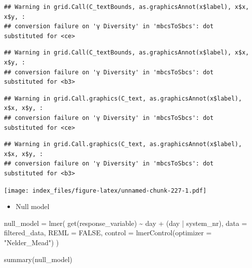 \documentclass[
]{article}
\newenvironment{Shaded}{\begin{snugshade}}{\end{snugshade}}
\newcommand{\AttributeTok}[1]{\textcolor[rgb]{0.77,0.63,0.00}{#1}}
\newcommand{\ConstantTok}[1]{\textcolor[rgb]{0.00,0.00,0.00}{#1}}
\newcommand{\FunctionTok}[1]{\textcolor[rgb]{0.00,0.00,0.00}{#1}}
\newcommand{\NormalTok}[1]{#1}
\newcommand{\OtherTok}[1]{\textcolor[rgb]{0.56,0.35,0.01}{#1}}
\newcommand{\SpecialCharTok}[1]{\textcolor[rgb]{0.00,0.00,0.00}{#1}}
\newcommand{\StringTok}[1]{\textcolor[rgb]{0.31,0.60,0.02}{#1}}
\providecommand{\tightlist}{%
  \setlength{\itemsep}{0pt}\setlength{\parskip}{0pt}}
\begin{document}
\begin{verbatim}
## Warning in grid.Call(C_textBounds, as.graphicsAnnot(x$label), x$x, x$y, :
## conversion failure on 'γ Diversity' in 'mbcsToSbcs': dot substituted for <ce>
\end{verbatim}

\begin{verbatim}
## Warning in grid.Call(C_textBounds, as.graphicsAnnot(x$label), x$x, x$y, :
## conversion failure on 'γ Diversity' in 'mbcsToSbcs': dot substituted for <b3>
\end{verbatim}

\begin{verbatim}
## Warning in grid.Call.graphics(C_text, as.graphicsAnnot(x$label), x$x, x$y, :
## conversion failure on 'γ Diversity' in 'mbcsToSbcs': dot substituted for <ce>
\end{verbatim}

\begin{verbatim}
## Warning in grid.Call.graphics(C_text, as.graphicsAnnot(x$label), x$x, x$y, :
## conversion failure on 'γ Diversity' in 'mbcsToSbcs': dot substituted for <b3>
\end{verbatim}

\texttt{[image: index\_files/figure-latex/unnamed-chunk-227-1.pdf]}

\begin{itemize}
\tightlist
\item
  Null model
\end{itemize}

\begin{Shaded}
\begin{Highlighting}[]
\NormalTok{null\_model }\OtherTok{=} \FunctionTok{lmer}\NormalTok{(}
  \FunctionTok{get}\NormalTok{(response\_variable) }\SpecialCharTok{\textasciitilde{}}
\NormalTok{    day }\SpecialCharTok{+} 
\NormalTok{    (day }\SpecialCharTok{|}\NormalTok{ system\_nr), }
  \AttributeTok{data =}\NormalTok{ filtered\_data,}
  \AttributeTok{REML =} \ConstantTok{FALSE}\NormalTok{,}
  \AttributeTok{control =} \FunctionTok{lmerControl}\NormalTok{(}\AttributeTok{optimizer =} \StringTok{"Nelder\_Mead"}\NormalTok{)}
\NormalTok{)}

\FunctionTok{summary}\NormalTok{(null\_model)}
\end{Highlighting}
\end{Shaded}
\end{document}

